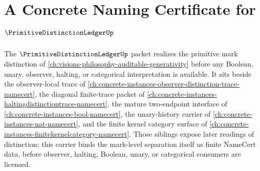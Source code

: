 \chapter{A Concrete Naming Certificate for $\PrimitiveDistinctionLedgerUp$}
\label{ch:concrete-instances-primitive-distinction-ledger-namecert}

The $\PrimitiveDistinctionLedgerUp$ packet realizes the primitive mark distinction of \autoref{ch:visions-philosophy-auditable-generativity} before any Boolean, unary, observer, halting, or categorical interpretation is available. It sits beside the observer-local trace of \autoref{ch:concrete-instances-observer-distinction-trace-namecert}, the diagonal finite-trace packet of \autoref{ch:concrete-instances-haltingdistinctiontrace-namecert}, the mature two-endpoint interface of \autoref{ch:concrete-instances-bool-namecert}, the unary-history carrier of \autoref{ch:concrete-instances-nat-namecert}, and the finite kernel category surface of \autoref{ch:concrete-instances-finitekernelcategory-namecert}. Those siblings expose later readings of distinction; this carrier binds the mark-level separation itself as finite NameCert data, before observer, halting, Boolean, unary, or categorical consumers are licensed.




